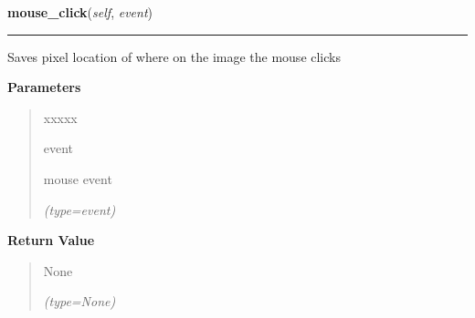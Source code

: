 \hspace{.8\funcindent}\begin{boxedminipage}{\funcwidth}

    \raggedright \textbf{mouse\_click}(\textit{self}, \textit{event})

    \vspace{-1.5ex}

    \rule{\textwidth}{0.5\fboxrule}
\setlength{\parskip}{2ex}
    Saves pixel location of where on the image the mouse clicks

\setlength{\parskip}{1ex}
      \textbf{Parameters}
      \vspace{-1ex}

      \begin{quote}
        \begin{Ventry}{xxxxx}

          \item[event]

          mouse event

            {\it (type=event)}

        \end{Ventry}

      \end{quote}

      \textbf{Return Value}
    \vspace{-1ex}

      \begin{quote}
      None

      {\it (type=None)}

      \end{quote}

    \end{boxedminipage}

    \label{client_gui:GuiClass:mouse_move}

    \vspace{0.5ex}

